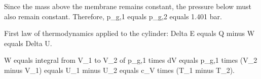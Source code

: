 Since the mass above the membrane remains constant, the pressure below must also remain constant. Therefore, p_g,1 equals p_g,2 equals 1.401 bar.  

First law of thermodynamics applied to the cylinder:  
Delta E equals Q minus W equals Delta U.  

W equals integral from V_1 to V_2 of p_g,1 times dV equals p_g,1 times (V_2 minus V_1) equals U_1 minus U_2 equals c_V times (T_1 minus T_2).